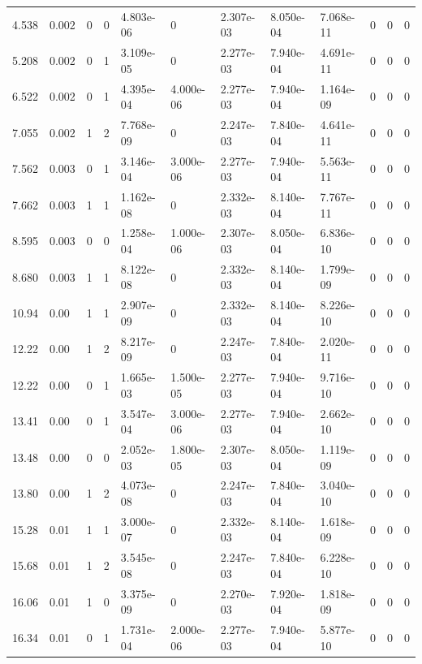\documentclass[preview]{standalone}
\begin{document}
{{\begin{tabular}{L{1.2cm}C{1.2cm} C{0.3cm}C{0.5cm} C{1.4cm}C{1.4cm} C{1.4cm}C{1.4cm} C{1.6cm}C{1.6cm} C{1.6cm}C{1.6cm}}
  4.538  &  0.002  & 0     &  0 &  4.803e-06  & 0  &  2.307e-03&   8.050e-04& 7.068e-11 & 0   &  0 & 0  \\ 
  5.208  &  0.002  & 0     &  1 &  3.109e-05  & 0  &  2.277e-03&   7.940e-04& 4.691e-11 & 0   &  0 & 0  \\ 
  6.522  &  0.002  & 0     &  1 &  4.395e-04  & 4.000e-06  &  2.277e-03&   7.940e-04& 1.164e-09 & 0   &  0 & 0  \\ 
  7.055  &  0.002  & 1     &  2 &  7.768e-09  & 0  &  2.247e-03&   7.840e-04& 4.641e-11 & 0   &  0 & 0  \\ 
  7.562  &  0.003  & 0     &  1 &  3.146e-04  & 3.000e-06  &  2.277e-03&   7.940e-04& 5.563e-11 & 0   &  0 & 0  \\ 
  7.662  &  0.003  & 1     &  1 &  1.162e-08  & 0  &  2.332e-03&   8.140e-04& 7.767e-11 & 0   &  0 & 0  \\ 
  8.595  &  0.003  & 0     &  0 &  1.258e-04  & 1.000e-06  &  2.307e-03&   8.050e-04& 6.836e-10 & 0   &  0 & 0  \\ 
  8.680  &  0.003  & 1     &  1 &  8.122e-08  & 0  &  2.332e-03&   8.140e-04& 1.799e-09 & 0   &  0 & 0  \\ 
  10.94  &  0.00  & 1     &  1 &  2.907e-09  & 0  &  2.332e-03&   8.140e-04& 8.226e-10 & 0   &  0 & 0  \\ 
  12.22  &  0.00  & 1     &  2 &  8.217e-09  & 0  &  2.247e-03&   7.840e-04& 2.020e-11 & 0   &  0 & 0  \\ 
  12.22  &  0.00  & 0     &  1 &  1.665e-03  & 1.500e-05  &  2.277e-03&   7.940e-04& 9.716e-10 & 0   &  0 & 0  \\ 
  13.41  &  0.00  & 0     &  1 &  3.547e-04  & 3.000e-06  &  2.277e-03&   7.940e-04& 2.662e-10 & 0   &  0 & 0  \\ 
  13.48  &  0.00  & 0     &  0 &  2.052e-03  & 1.800e-05  &  2.307e-03&   8.050e-04& 1.119e-09 & 0   &  0 & 0  \\ 
  13.80  &  0.00  & 1     &  2 &  4.073e-08  & 0  &  2.247e-03&   7.840e-04& 3.040e-10 & 0   &  0 & 0  \\ 
  15.28  &  0.01  & 1     &  1 &  3.000e-07  & 0  &  2.332e-03&   8.140e-04& 1.618e-09 & 0   &  0 & 0  \\ 
  15.68  &  0.01  & 1     &  2 &  3.545e-08  & 0  &  2.247e-03&   7.840e-04& 6.228e-10 & 0   &  0 & 0  \\ 
  16.06  &  0.01  & 1     &  0 &  3.375e-09  & 0  &  2.270e-03&   7.920e-04& 1.818e-09 & 0   &  0 & 0  \\ 
  16.34  &  0.01  & 0     &  1 &  1.731e-04  & 2.000e-06  &  2.277e-03&   7.940e-04& 5.877e-10 & 0   &  0 & 0  \\ 

\end{tabular}}}
\end{document}
